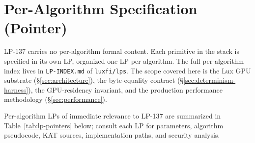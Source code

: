 \section{Per-Algorithm Specification (Pointer)}
\label{sec:per-algorithm-spec}

LP-137 carries no per-algorithm formal content. Each primitive in the stack is specified in its own LP, organized one LP per algorithm. The full per-algorithm index lives in \texttt{LP-INDEX.md} of \texttt{luxfi/lps}. The scope covered here is the Lux GPU substrate (\S\ref{sec:architecture}), the byte-equality contract (\S\ref{sec:determinism-harness}), the GPU-residency invariant, and the production performance methodology (\S\ref{sec:performance}).

Per-algorithm LPs of immediate relevance to LP-137 are summarized in Table~\ref{tab:lp-pointers} below; consult each LP for parameters, algorithm pseudocode, KAT sources, implementation paths, and security analysis.

